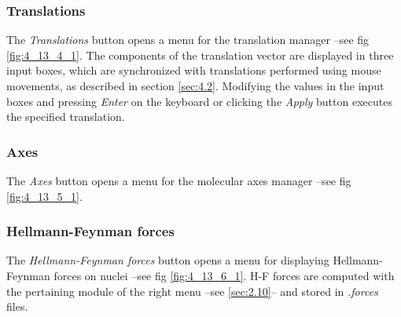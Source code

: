 \documentclass[10pt]{article}
\begin{document}
\subsubsection{Translations \label{sec:4.13.4}}

The {\it Translations} button opens a menu for the translation manager --see fig \ref{fig:4_13_4_1}.
The components of the translation vector are displayed in three input boxes, which
are synchronized with translations performed using mouse movements,
as described in section \ref{sec:4.2}. Modifying the values in the input boxes and pressing {\it Enter} on the keyboard or clicking the {\it Apply} button executes the specified translation.


\subsubsection{Axes \label{sec:4.13.5}}

The {\it Axes} button opens a menu for the molecular axes manager --see fig \ref{fig:4_13_5_1}.


\subsubsection{Hellmann-Feynman forces \label{sec:4.13.6}}

The {\it Hellmann-Feynman forces} button opens a menu for displaying Hellmann-Feynman forces 
on nuclei --see fig \ref{fig:4_13_6_1}. H-F forces are computed with the pertaining
module of the right menu --see \ref{sec:2.10}--
and stored in {\it .forces} files.
\end{document}
